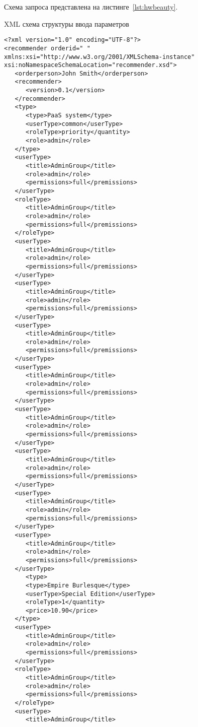 Схема запроса представлена на листинге~\cref{lst:hwbeauty}.
\begin{ListingEnv}[!h]%
    \captiondelim{ } %
    \caption{XML схема структуры ввода параметров}\label{lst:hwbeauty}
    \begin{lstlisting}[language={[ISO]xml}]
<?xml version="1.0" encoding="UTF-8"?>
<recommender orderid=" "
xmlns:xsi="http://www.w3.org/2001/XMLSchema-instance"
xsi:noNamespaceSchemaLocation="recommender.xsd">
   <orderperson>John Smith</orderperson>
   <recommender>
      <version>0.1</version>
   </recommender>
   <type>
      <type>PaaS system</type>
      <userType>common</userType>
      <roleType>priority</quantity>
      <role>admin</role>
   </type>
   <userType>
      <title>AdminGroup</title>
      <role>admin</role>
      <permissions>full</premissions>
   </userType>
   <roleType>
      <title>AdminGroup</title>
      <role>admin</role>
      <permissions>full</premissions>
   </roleType>
   <userType>
      <title>AdminGroup</title>
      <role>admin</role>
      <permissions>full</premissions>
   </userType>
   <userType>
      <title>AdminGroup</title>
      <role>admin</role>
      <permissions>full</premissions>
   </userType>
   <userType>
      <title>AdminGroup</title>
      <role>admin</role>
      <permissions>full</premissions>
   </userType>
   <userType>
      <title>AdminGroup</title>
      <role>admin</role>
      <permissions>full</premissions>
   </userType>
   <userType>
      <title>AdminGroup</title>
      <role>admin</role>
      <permissions>full</premissions>
   </userType>
   <userType>
      <title>AdminGroup</title>
      <role>admin</role>
      <permissions>full</premissions>
   </userType>
   <userType>
      <title>AdminGroup</title>
      <role>admin</role>
      <permissions>full</premissions>
   </userType>
   <userType>
      <title>AdminGroup</title>
      <role>admin</role>
      <permissions>full</premissions>
   </userType>
      <type>
      <type>Empire Burlesque</type>
      <userType>Special Edition</userType>
      <roleType>1</quantity>
      <price>10.90</price>
   </type>
   <userType>
      <title>AdminGroup</title>
      <role>admin</role>
      <permissions>full</premissions>
   </userType>
   <roleType>
      <title>AdminGroup</title>
      <role>admin</role>
      <permissions>full</premissions>
   </roleType>
   <userType>
      <title>AdminGroup</title>

\end{lstlisting}
\end{ListingEnv}

